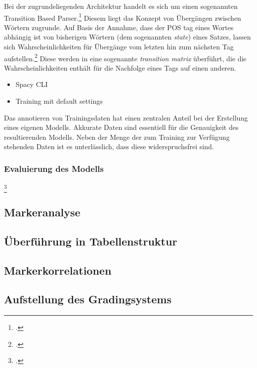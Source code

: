 Bei der zugrundeliegenden Architektur handelt es sich um einen sogenannten Transition Based Parser.\footcite{zotero-182} Diesem liegt das Konzept von Übergängen zwischen Wörtern zugrunde. Auf Basis der Annahme, dass der \acl*{POS} tag eines Wortes abhängig ist von bisherigen Wörtern (dem sogenannten \textit{state}) eines Satzes, lassen sich Wahrscheinlichkeiten für Übergänge vom letzten hin zum nächsten Tag aufstellen.\footcite{honnibal2013a} Diese werden in eine sogenannte \textit{transition matrix} überführt, die die Wahrscheinlichkeiten enthält für die Nachfolge eines Tags auf einen anderen.
\begin{itemize}
    \item Spacy CLI
    \item Training mit default settings
\end{itemize}
Das annotieren von Trainingsdaten hat einen zentralen Anteil bei der Erstellung eines eigenen Modells. Akkurate Daten sind essentiell für die Genauigkeit des resultierenden Modells. Neben der Menge der zum Training zur Verfügung stehenden Daten ist es unterlässlich, dass diese widerspruchsfrei sind.

\subsubsection{Evaluierung des Modells}
\footcite[]{tsai2006}

\subsection{Markeranalyse}
\subsection{Überführung in Tabellenstruktur}
\subsection{Markerkorrelationen}
\subsection{Aufstellung des Gradingsystems}
